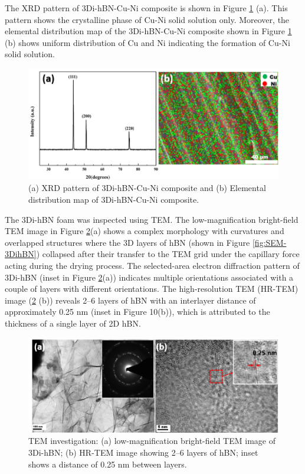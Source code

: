 The XRD pattern of 3Di-hBN-Cu-Ni composite is shown in Figure \ref{fig:XRD-element distribution} (a). This pattern shows the crystalline phase of Cu-Ni solid solution only. Moreover, the elemental distribution map of the 3Di-hBN-Cu-Ni composite shown in Figure \ref{fig:XRD-element distribution} (b) shows uniform distribution of Cu and Ni indicating the formation of Cu-Ni solid solution.

\begin{figure}[!htb]
\centering
\includegraphics [width=\linewidth]{graphics/chapter_2/XRD-element distribution}
\caption{(a) XRD pattern of 3Di-hBN-Cu-Ni composite and (b) Elemental distribution map of 3Di-hBN-Cu-Ni composite.}
\label{fig:XRD-element distribution}
\end{figure}

The 3Di-hBN foam was inspected using TEM. The low-magnification bright-field TEM image in Figure \ref{fig:TEM-3DihBN}(a) shows a complex morphology with curvatures and overlapped structures where the 3D layers of hBN (shown in Figure \ref{fig:SEM-3DihBN}) collapsed after their transfer to the TEM grid under the capillary force acting during the drying process. The selected-area electron diffraction pattern of 3Di-hBN (inset in Figure \ref{fig:TEM-3DihBN}(a)) indicates multiple orientations associated with a couple of layers with different orientations. The high-resolution TEM (HR-TEM) image (\ref{fig:TEM-3DihBN} (b)) reveals 2–6 layers of hBN with an interlayer distance of approximately 0.25 nm (inset in Figure 10(b)), which is attributed to the thickness of a single layer of 2D hBN.

\begin{figure}[!htb]
\centering
\includegraphics [width=\linewidth]{graphics/chapter_2/TEM-3DihBN}
\caption{TEM investigation: (a) low-magnification bright-field TEM image of 3Di-hBN; (b) HR-TEM image showing 2–6 layers of hBN; inset shows a distance of 0.25 nm between layers.}
\label{fig:TEM-3DihBN}
\end{figure}

